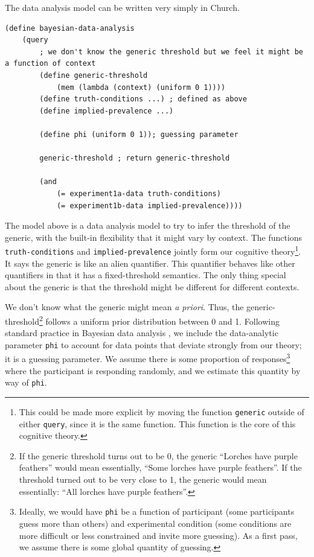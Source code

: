 \documentclass[10pt,letterpaper]{article}
\begin{document}
The data analysis model can be written very simply in Church.

\begin{lstlisting}
(define bayesian-data-analysis 
	(query
		; we don't know the generic threshold but we feel it might be a function of context
		(define generic-threshold 
			(mem (lambda (context) (uniform 0 1))))
		(define truth-conditions ...) ; defined as above
		(define implied-prevalence ...)
		
		(define phi (uniform 0 1)); guessing parameter
				
		generic-threshold ; return generic-threshold	
		
		(and 
			(= experiment1a-data truth-conditions)
			(= experiment1b-data implied-prevalence))))

\end{lstlisting}

The model above is a data analysis model to try to infer the threshold of the generic, with the built-in flexibility that it might vary by context. The functions \lstinline{truth-conditions} and \lstinline{implied-prevalence} jointly form our cognitive theory\footnote{This could be made more explicit by moving the function \lstinline{generic} outside of either \lstinline{query}, since it is the same function. This function is the core of this cognitive theory.}. It says the generic is like an alien quantifier. This quantifier behaves like other quantifiers in that it has a fixed-threshold semantics. The only thing special about the generic is that the threshold might be different for different contexts. 

We don't know what the generic might mean \emph{a priori}. Thus, the generic-threshold\footnote{If the generic threshold turns out to be 0, the generic ``Lorches have purple feathers'' would mean essentially, ``Some lorches have purple feathers''. If the threshold turned out to be very close to 1, the generic would mean essentially: ``All lorches have purple feathers''.} follows a uniform prior distribution between 0 and 1. Following standard practice in Bayesian data analysis \cite{LW2014}, we include the data-analytic parameter \lstinline{phi} to account for data points that deviate strongly from our theory; it is a guessing parameter. We assume there is some proportion of responses\footnote{Ideally, we would have \lstinline{phi} be a function of participant (some participants guess more than others) and experimental condition (some conditions are more difficult or less constrained and invite more guessing). As a first pass, we assume there is some global quantity of guessing.} where the participant is responding randomly, and we estimate this quantity by way of \lstinline{phi}.
\end{document}
